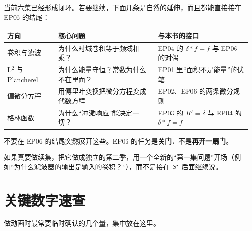 当前六集已经形成闭环。若要继续，下面几条是自然的延伸，而且都能直接接在 EP06 的结尾：

\begin{center}
\small
\renewcommand{\arraystretch}{1.45}
\begin{tabularx}{\textwidth}{@{}L{3.4cm}L{5.4cm}Y@{}}
\toprule
方向 & 核心问题 & 与本书的接口 \\
\midrule
卷积与滤波 & 为什么时域卷积等于频域相乘？ & EP04 的 $\delta*f=f$ 与 EP06 的对偶 \\
L$^{2}$ 与 Plancherel & 为什么能量守恒？常数为什么不在里面？ & EP01 里“面积不是能量”的伏笔 \\
偏微分方程 & 用傅里叶变换把微分方程变成代数方程 & EP02、EP06 的两条微分规则 \\
格林函数 & 为什么“冲激响应”能决定一切？ & EP03 的 $H'=\delta$ 与 EP04 的 $\delta*f=f$ \\
\bottomrule
\end{tabularx}
\end{center}

\begin{notebox}[扩展的纪律]
不要在 EP06 的结尾突然展开这些。EP06 的任务是\textbf{关门}，不是\textbf{再开一扇门}。

如果真要做续集，把它做成独立的第二季，用一个全新的“第一集问题”开场（例如“为什么滤波器的输出是输入的卷积？”），而不是接在 $\mathcal{S}'$ 后面继续说。
\end{notebox}

\section{关键数字速查}

做动画时最常要临时确认的几个量，集中放在这里。

